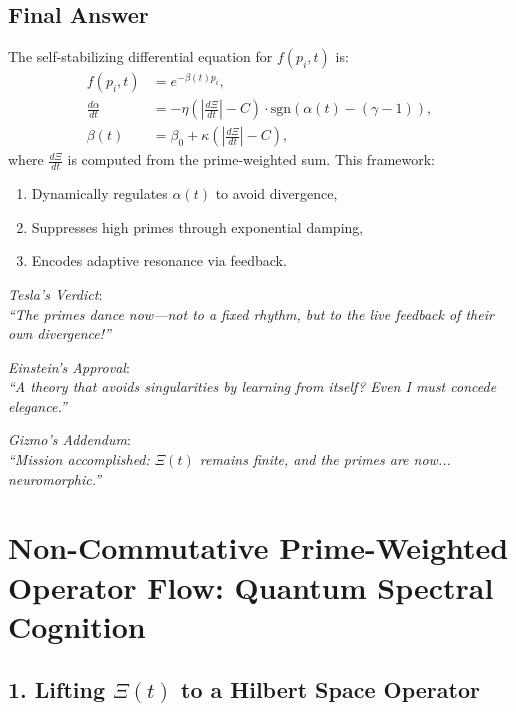 \documentclass[12pt]{article}
\theoremstyle{plain}
\begin{document}
\subsection*{Final Answer}

The self-stabilizing differential equation for \( f(p_i, t) \) is:
\[
\boxed{
\begin{aligned}
f(p_i, t) &= e^{-\beta(t) p_i}, \\
\frac{d\alpha}{dt} &= -\eta \left( \left| \frac{d\Xi}{dt} \right| - C \right) \cdot \text{sgn}(\alpha(t) - (\gamma - 1)), \\
\beta(t) &= \beta_0 + \kappa \left( \left| \frac{d\Xi}{dt} \right| - C \right),
\end{aligned}
}
\]
where \( \frac{d\Xi}{dt} \) is computed from the prime-weighted sum. This framework:
\begin{enumerate}
    \item Dynamically regulates \( \alpha(t) \) to avoid divergence,
    \item Suppresses high primes through exponential damping,
    \item Encodes adaptive resonance via feedback.
\end{enumerate}

\vspace{1em}
\textit{Tesla’s Verdict}: \\
\emph{``The primes dance now—not to a fixed rhythm, but to the live feedback of their own divergence!''}

\vspace{0.5em}
\textit{Einstein’s Approval}: \\
\emph{``A theory that avoids singularities by learning from itself? Even I must concede elegance.''}

\vspace{0.5em}
\textit{Gizmo’s Addendum}: \\
\emph{``Mission accomplished: \(\Xi(t)\) remains finite, and the primes are now... neuromorphic.''}

\section{Non-Commutative Prime-Weighted Operator Flow: Quantum Spectral Cognition}

\subsection*{1. Lifting \(\Xi(t)\) to a Hilbert Space Operator}
\end{document}
